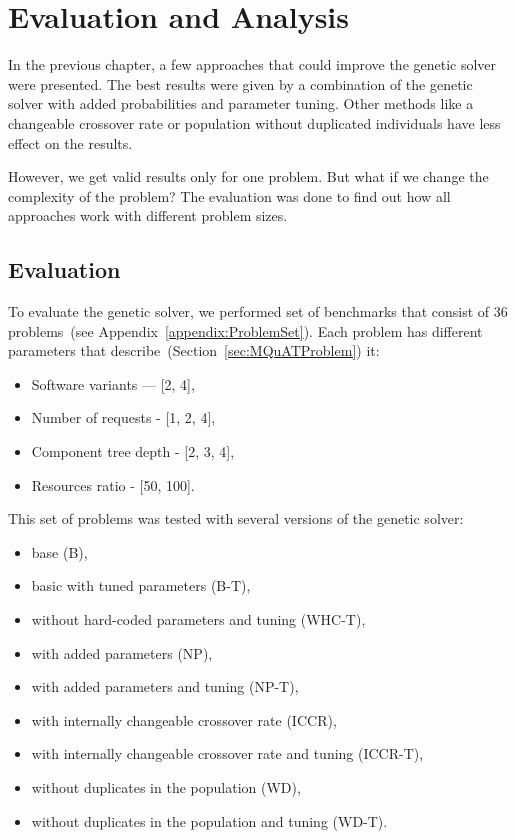 \chapter{Evaluation and Analysis}
\label{chapter:evaluationAnalysis}

In the previous chapter, a few approaches that could improve the genetic solver were presented.
The best results were given by a combination of the genetic solver with added probabilities and parameter tuning.
Other methods like a changeable crossover rate or population without duplicated individuals have less effect on the results.

However, we get valid results only for one problem. But what if we change the complexity of the problem? The evaluation was done to find out how all approaches work with different problem sizes. 

\section{Evaluation}
\label{sec:evaluation}

To evaluate the genetic solver, we performed set of benchmarks that consist of 36 problems~(see Appendix~\ref{appendix:ProblemSet}). Each problem has different parameters that describe~(Section~\ref{sec:MQuATProblem}) it:

\begin{itemize}
	\item Software variants — [2, 4],
	\item Number of requests - [1, 2, 4],
	\item Component tree depth - [2, 3, 4],
	\item  Resources ratio - [50, 100].
\end{itemize}

This set of problems was tested with several versions of the genetic solver:

\begin{itemize}
	\item base (B),
	\item basic with tuned parameters (B-T),
	\item without hard-coded parameters and tuning (WHC-T),
	\item with added parameters (NP),
	\item with added parameters and tuning (NP-T),
	\item with internally changeable crossover rate (ICCR),
	\item with internally changeable crossover rate and tuning (ICCR-T),
	\item without duplicates in the population (WD),
	\item without duplicates in the population and tuning (WD-T).
\end{itemize}

